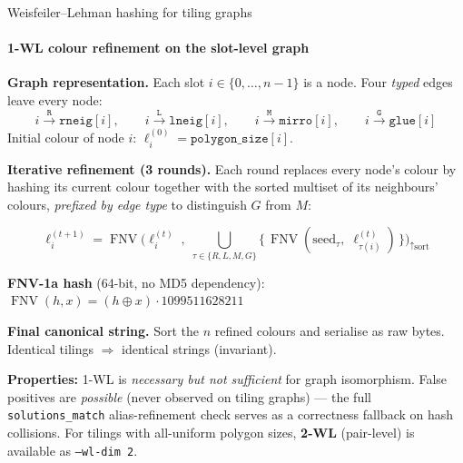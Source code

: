 \begin{frame}[fragile]{Weisfeiler--Lehman hashing for tiling graphs}
\framesubtitle{1-WL colour refinement on the slot-level graph}

\textbf{Graph representation.}  Each slot $i \in \{0,\dots,n-1\}$ is a node.
Four \emph{typed} edges leave every node:
\[
  i \xrightarrow{\;\mathtt{R}\;} \mathtt{rneig}[i],\qquad
  i \xrightarrow{\;\mathtt{L}\;} \mathtt{lneig}[i],\qquad
  i \xrightarrow{\;\mathtt{M}\;} \mathtt{mirro}[i],\qquad
  i \xrightarrow{\;\mathtt{G}\;} \mathtt{glue}[i]
\]
Initial colour of node $i$: $\ell_i^{(0)} = \mathtt{polygon\_size}[i]$.

\vspace{2pt}
\textbf{Iterative refinement (3 rounds).}  Each round replaces every node's
colour by hashing its current colour together with the sorted multiset of its
neighbours' colours, \emph{prefixed by edge type} to distinguish $G$ from $M$:

\vspace{-2pt}
\[
  \ell_i^{(t+1)} = \operatorname{FNV}\!\Big(
    \ell_i^{(t)}\;,\;
    \textstyle\bigcup_{\tau\in\{R,L,M,G\}}\!\big\{\,
      \operatorname{FNV}(\text{seed}_\tau,\; \ell_{\tau(i)}^{(t)})
    \,\big\}
  \Big)_{\uparrow\text{sort}}
\]
\vspace{-2pt}

\textbf{FNV-1a hash} (64-bit, no MD5 dependency):
$\operatorname{FNV}(h, x) = (h \oplus x) \cdot 1099511628211$

\vspace{2pt}
\textbf{Final canonical string.}  Sort the $n$ refined colours and serialise
as raw bytes.  Identical tilings $\Rightarrow$ identical strings (invariant).

\vspace{2pt}
\footnotesize
\textbf{Properties:}  1-WL is \emph{necessary but not sufficient} for graph
isomorphism.  False positives are \emph{possible} (never observed on tiling
graphs) --- the full \texttt{solutions\_match} alias-refinement check serves as
a correctness fallback on hash collisions.  For tilings with all-uniform
polygon sizes, \textbf{2-WL} (pair-level) is available as \texttt{--wl-dim 2}.
\end{frame}

